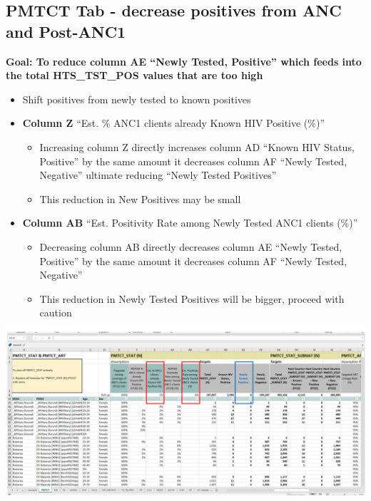 \documentclass[
  openany]{book}
\providecommand{\tightlist}{%
  \setlength{\itemsep}{0pt}\setlength{\parskip}{0pt}}
\begin{document}
\hypertarget{pmtct-tab---decrease-positives-from-anc-and-post-anc1}{%
\subsection{PMTCT Tab - decrease positives from ANC and Post-ANC1}\label{pmtct-tab---decrease-positives-from-anc-and-post-anc1}}

\textbf{Goal: To reduce column AE ``Newly Tested, Positive'' which feeds into the total HTS\_TST\_POS values that are too high}

\begin{itemize}
\item
  Shift positives from newly tested to known positives
\item
  \textbf{Column Z} ``Est. \% ANC1 clients already Known HIV Positive (\%)''

  \begin{itemize}
  \tightlist
  \item
    Increasing column Z directly increases column AD ``Known HIV Status, Positive'' by the same amount it decreases column AF ``Newly Tested, Negative'' ultimate reducing ``Newly Tested Positives''
  \item
    This reduction in New Positives may be small
  \end{itemize}
\item
  \textbf{Column AB} ``Est. Positivity Rate among Newly Tested ANC1 clients (\%)''

  \begin{itemize}
  \tightlist
  \item
    Decreasing column AB directly decreases column AE ``Newly Tested, Positive'' by the same amount it decreases column AF ``Newly Tested, Negative''
  \item
    This reduction in Newly Tested Positives will be bigger, proceed with caution
  \end{itemize}
\end{itemize}

\begin{center}

\includegraphics[width=7in]{./images/image16.png}

\end{center}
\end{document}

